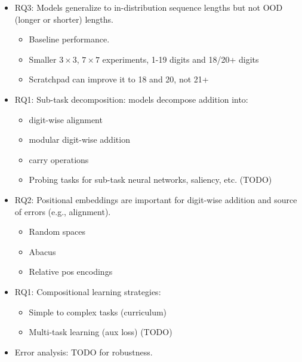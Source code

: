 \begin{itemize}
    \item RQ3: Models generalize to in-distribution sequence lengths but not OOD (longer or shorter) lengths.
          \begin{itemize}
              \item Baseline performance.
              \item Smaller $3 \times 3$, $7 \times 7$ experiments, 1-19 digits and 18/20+ digits
              \item Scratchpad can improve it to 18 and 20, not 21+
          \end{itemize}
          
    \item RQ1: Sub-task decomposition: models decompose addition into:
          \begin{itemize}
              \item digit-wise alignment
              \item modular digit-wise addition
              \item carry operations
              \item Probing tasks for sub-task neural networks, saliency, etc. (TODO)
          \end{itemize}
          
    \item RQ2: Positional embeddings are important for digit-wise addition and source of errors (e.g., alignment).
          \begin{itemize}
              \item Random spaces
              \item Abacus
              \item Relative pos encodings
          \end{itemize}
          
    \item RQ1: Compositional learning strategies:
          \begin{itemize}
              \item Simple to complex tasks (curriculum)
              \item Multi-task learning (aux loss) (TODO)
          \end{itemize}
          
    \item Error analysis: TODO for robustness.
          
\end{itemize}